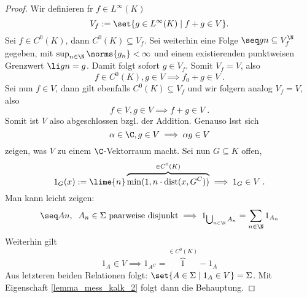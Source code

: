 \begin{proof}
	Wir definieren f\us r \(f\in L^\infty(K)\)
	\[V_f := \set{g\in L^\infty(K)\;\vert\; f+g \in V}.\]
	Sei \(f\in C^0(K)\), dann \(C^0(K)\subseteq V_f\). Sei weiterhin eine Folge \(\seq gn \subseteq V_f^\N\) gegeben, mit \(\sup_{n\in\N} \norms{g_n} < \infty\) und einem existierenden punktweisen Grenzwert \(\li gn = g\). Damit folgt sofort \(g\in V_f\). Somit \(V_f = V\), also 
	\[f \in C^0(K), g\in V \implies f_0 + g \in V\;.\]
	Sei nun \(f\in V\), dann gilt ebenfalls \(C^0(K) \subseteq V_f\) und wir folgern analog \(V_f = V\), also 
	\[f\in V, g\in V \implies f + g \in V\;.\] 
	Somit ist $V$ also abgeschlossen bzgl. der Addition. Genauso l\as sst sich \[\alpha \in \C, g\in V \implies \alpha g \in V\] zeigen, was $V$ zu einem \(\C\)-Vektorraum macht.
	Sei nun \(G\subseteq K\) offen, 
	\[1_G(x) := \lime{n} \overbrace{\min(1,n\cdot \text{dist}(x, G^C))}^{\in C^0(K)} \implies 1_G \in V\;.\]
	Man kann leicht zeigen:
	\[\seq An,\;\; A_n \in \Sigma \text{ paarweise disjunkt} \implies 1_{\bigcup_{n\in\N} A_n} = \sum_{n\in\N} 1_{A_n}\]
	Weiterhin gilt
	\[1_A\in V \implies 1_{A^C} = \overbrace{1}^{\in C^0(K)}-1_A\]
	Aus letzteren beiden Relationen folgt: \(\set{A\in \Sigma \;\vert\; 1_A\in V} = \Sigma\). Mit Eigenschaft \ref{lemma_mess_kalk_2} folgt dann die Behauptung.
\end{proof}